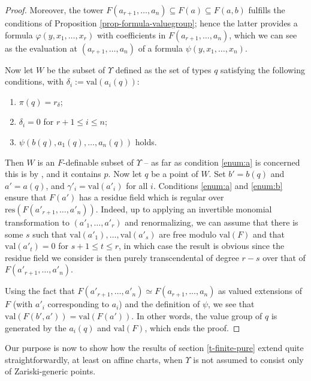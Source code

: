 \documentclass[JEP,XML,SOM,Unicode,ThmDefs,NoEqCountersInSection,published]{cedram}
\newenvironment{enumeratea}
{\bgroup\def\theenumi{\alph{enumi}}\begin{enumerate}}
{\end{enumerate}\egroup}
\newcommand{\val}{\mathrm{val}}
\let\phi\varphi
\theoremstyle{plain}
\theoremstyle{definition}
\begin{document}
\begin{proof}
Moreover, the tower $F(a_{r+1},\ldots, a_n)\subseteq F(a)\subseteq F(a,b)$ fulfills
the conditions of Proposition \ref{prop-formula-valuegroup}; hence the latter provides a formula
$\phi(y, x_1,\ldots, x_r)$ with coefficients in $F(a_{r+1},\ldots, a_n)$,
which we can see as the evaluation at $(a_{r+1},\ldots, a_n)$ of a formula
$\psi(y,x_1,\ldots, x_n)$.

Now let $W$ be the subset of $\Upsilon$ defined as the set of types $q$ satisfying the following conditions, with $\delta_i:=
\val(a_i(q))$:\enlargethispage{.5\baselineskip}%
\begin{enumeratea}
\item\label{enum:a} $\pi(q)=r_\delta$;
\item\label{enum:b} $\delta_i=0$ for $r+1\leq i\leq n$;
\item\label{enum:c} $\psi(b(q), a_1(q), \ldots, a_n(q))$ holds.
\end{enumeratea}

Then $W$ is an $F$-definable subset of $\Upsilon$ -- as far as condition \eqref{enum:a} is concerned this is
by \cite[Lem.\,8.2.9]{HL}, and it contains $p$.
Now let $q$ be a point of $W$. Set $b'=b(q)$ and $a'=a(q)$, and $\gamma'_i=\val (a'_i)$ for all $i$.
Conditions \eqref{enum:a} and \eqref{enum:b} ensure that $F(a')$ has a residue field which is regular over $\mathrm{res}(F(a'_{r+1},\ldots, a'_n))$.
Indeed, up to applying an invertible monomial transformation to $(a'_1,\ldots, a'_r)$ and renormalizing, we can assume that there is some $s$
such that $\val(a'_1), \ldots, \val (a'_s)$
are free modulo $\val(F)$ and that $\val(a'_t)=0$ for $s+1\leq t\leq r$, in which case the result is obvious since the residue field we consider is then purely transcendental of degree $r-s$ over that of $F(a'_{r+1}, \ldots, a'_n)$.

Using the fact that $F(a'_{r+1},\ldots, a'_n)\simeq F(a_{r+1}, \ldots, a_n)$ as valued extensions of $F$
(with $a'_i$ corresponding to $a_i$) and
the definition of $\psi$, we see that $\val(F(b',a'))=\val(F(a'))$. In other words, the value group of
$q$ is generated by the $a_i(q)$ and $\val(F)$, which ends the proof.
\end{proof}

Our purpose is now to show how the results of section \ref{t-finite-pure}
extend quite straightforwardly, at least on affine charts, when $\Upsilon$ is not assumed to consist only of
Zariski-generic points.
\end{document}
